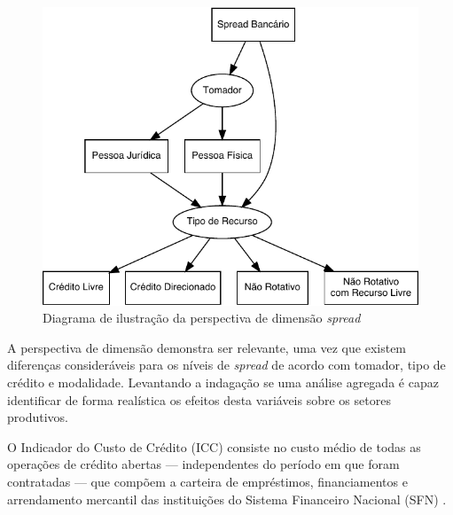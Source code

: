 \documentclass[
  12pt,
  12pt,
  openright,
  oneside,
  a4paper,
  chapter=TITLE,
  section=TITLE,
  subsection=TITLE,
  subsubsection=TITLE,
  english,
  portugues,
  sumario=tradicional]{abntex2}
\begin{document}
\begin{figure}[!htbp]
\vspace{20pt}
\caption{Diagrama de ilustração da perspectiva de dimensão  \emph{spread}}
\vspace{-4mm}

\begin{center}\includegraphics{12-exportedfigures/diagram.spread.dim-1} \end{center}
\vspace{-3mm}
\label{fig:diagramc}
\vspace{-2mm}
\end{figure}

A perspectiva de dimensão demonstra ser relevante, uma vez que existem diferenças consideráveis para os níveis de \emph{spread} de acordo com tomador, tipo de crédito e modalidade. Levantando a indagação se uma análise agregada é capaz identificar de forma realística os efeitos desta variáveis sobre os setores produtivos.

O Indicador do Custo de Crédito (ICC) consiste no custo médio de todas as operações de crédito abertas --- independentes do período em que foram contratadas --- que compõem a carteira de empréstimos, financiamentos e arrendamento mercantil das instituições do Sistema Financeiro Nacional (SFN) \cite{BCB:2000}.
\end{document}
